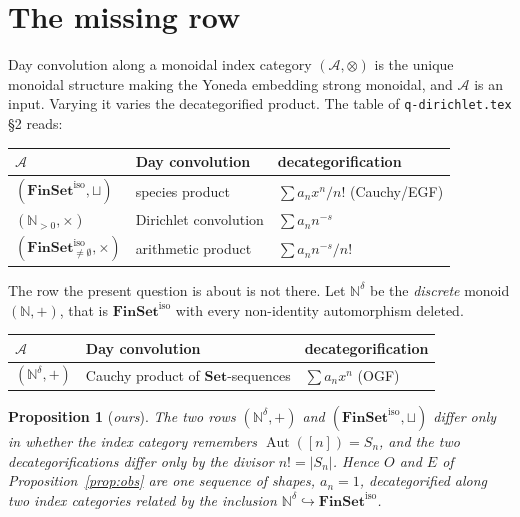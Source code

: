 \documentclass[11pt,a4paper]{article}
\newtheorem{proposition}[theorem]{Proposition}
\theoremstyle{definition}
\theoremstyle{remark}
\newcommand{\NN}{\mathbb{N}}
\newcommand{\cat}[1]{\mathbf{#1}}
\newcommand{\Set}{\cat{Set}}
\newcommand{\FinSet}{\cat{FinSet}}
\newcommand{\iso}{\mathrm{iso}}
\newcommand{\norm}[1]{\lvert #1 \rvert}
\DeclareMathOperator{\Aut}{Aut}
\begin{document}
\section{The missing row}

Day convolution along a monoidal index category $(\mathcal{A}, \otimes)$ is the
unique monoidal structure making the Yoneda embedding strong monoidal, and
$\mathcal{A}$ is an input. Varying it varies the decategorified product. The table
of \texttt{q-dirichlet.tex} \S2 reads:

\begin{center}
\small
\begin{tabular}{@{}lll@{}}
\toprule
$\mathcal{A}$ & Day convolution & decategorification \\
\midrule
$(\FinSet^{\iso}, \sqcup)$ & species product & $\sum a_n x^n/n!$ (Cauchy/EGF) \\
$(\NN_{>0}, \times)$ & Dirichlet convolution & $\sum a_n n^{-s}$ \\
$(\FinSet^{\iso}_{\neq\emptyset}, \times)$ & arithmetic product & $\sum a_n n^{-s}/n!$ \\
\bottomrule
\end{tabular}
\end{center}

\noindent
The row the present question is about is not there. Let $\NN^{\delta}$ be the
\emph{discrete} monoid $(\NN, +)$, that is $\FinSet^{\iso}$ with every
non-identity automorphism deleted.

\begin{center}
\small
\begin{tabular}{@{}lll@{}}
\toprule
$\mathcal{A}$ & Day convolution & decategorification \\
\midrule
$(\NN^{\delta}, +)$ & Cauchy product of $\Set$-sequences & $\sum a_n x^n$ (OGF) \\
\bottomrule
\end{tabular}
\end{center}

\begin{proposition}[\emph{ours}]\label{prop:row}
The two rows $(\NN^{\delta},+)$ and $(\FinSet^{\iso},\sqcup)$ differ only in whether
the index category remembers $\Aut([n]) = S_n$, and the two decategorifications
differ only by the divisor $n! = \norm{S_n}$. Hence $O$ and $E$ of
Proposition~\ref{prop:obs} are one sequence of shapes, $a_n = 1$, decategorified
along two index categories related by the inclusion
$\NN^{\delta} \hookrightarrow \FinSet^{\iso}$.
\end{proposition}
\end{document}
